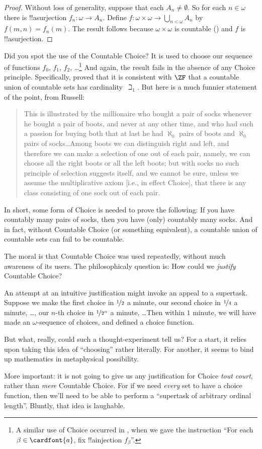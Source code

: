 \documentclass[../../../include/open-logic-section]{subfiles}
\begin{document}
\begin{proof}
Without loss of generality, suppose that each $A_n \neq \emptyset$. So
for each $n \in \omega$ there is !!a{surjection} $f_n \colon \omega
\to A_n$. Define $f \colon \omega \times \omega \to \bigcup_{n <
\omega} A_n$ by $f(m, n) = f_n(m)$. The result follows because $\omega
\times \omega$ is countable
() and $f$ is
!!a{surjection}.
\end{proof}
\noindent 
Did you spot the use of the Countable Choice? It is used to choose our
sequence of functions $f_0$, $f_1$, $f_2$, \dots\footnote{A similar
use of Choice occurred in
, when we gave the instruction ``For each $\beta \in \cardfont{a}$, fix !!a{injection} $f_\beta$''.} And
again, the result fails in the absence of any Choice principle.
Specifically, \citet{FefermanLevy1963} proved that it is consistent
with $\ZF$ that a countable union of countable sets has
cardinality~$\beth_1$. But here is a much funnier statement of the
point, from Russell:
\begin{quote}
  This is illustrated by the millionaire who bought a pair of socks
  whenever he bought a pair of boots, and never at any other time, and
  who had such a passion for buying both that at last he had
  $\aleph_0$ pairs of boots and $\aleph_0$ pairs of socks\dots\@ Among
  boots we can distinguish right and left, and therefore we can make a
  selection of one out of each pair, namely, we can choose all the
  right boots or all the left boots; but with socks no such principle
  of selection suggests itself, and we cannot be sure, unless we
  assume the multiplicative axiom [i.e., in effect Choice], that there
  is any class consisting of one sock out of each pair.
  \citep[p.~126]{Russell1919}
\end{quote}
In short, some form of Choice is needed to prove the following: If you
have countably many pairs of socks, then you have (only) countably
many socks. And in fact, without Countable Choice (or something
equivalent), a countable union of countable sets can fail to be
countable. 

The moral is that Countable Choice was used repeatedly, without much
awareness of its users. The philosophicaly question is: How could we
\emph{justify} Countable Choice? 

An attempt at an intuitive justification might invoke an appeal to a
supertask. Suppose we make the first choice in $\nicefrac{1}{2}$ a
minute, our second choice in $\nicefrac{1}{4}$ a minute, \dots, our
$n$-th choice in $\nicefrac{1}{2^n}$ a minute, \dots\@ Then within $1$
minute, we will have made an $\omega$-sequence of choices, and defined
a choice function. 

But what, really, could such a thought-experiment tell us? For a
start, it relies upon taking this idea of ``choosing'' rather
literally. For another, it seems to bind up mathematics in
metaphysical possibility. 

More important: it is not going to give us any justification for
Choice \emph{tout court}, rather than \emph{mere} Countable Choice.
For if we need \emph{every} set to have a choice function, then we'll
need to be able to perform a ``supertask of arbitrary ordinal
length''. Bluntly, that idea is laughable.
\end{document}
